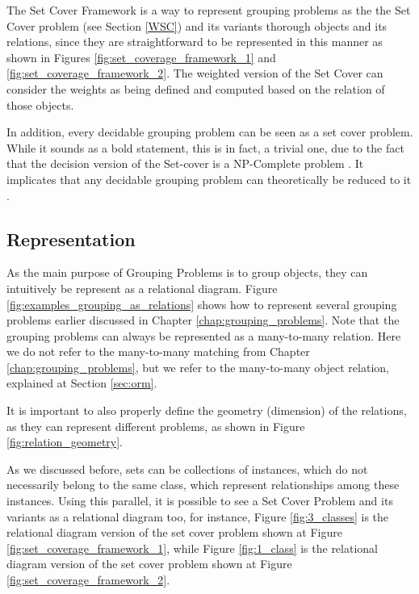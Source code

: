         The Set Cover Framework is a way to represent grouping problems as the the Set Cover problem (see Section \ref{WSC}) and its variants thorough objects and its relations, since they are straightforward to be represented in this manner as shown in Figures \ref{fig:set_coverage_framework_1} and \ref{fig:set_coverage_framework_2}.
        The weighted version of the Set Cover can consider the weights as being defined and computed based on the relation of those objects.

        In addition, every decidable grouping problem can be seen as a set cover problem.
        While it sounds as a bold statement, this is in fact, a trivial one, due to the fact that the decision version of the Set-cover is a NP-Complete problem \cite{karp1972reducibility}.
        It implicates that any decidable grouping problem can theoretically be reduced to it \cite{garey1979computers}.

        
        
    
        \subsection{Representation}
             As the main purpose of Grouping Problems is to group objects, they can intuitively be represent as a relational diagram. Figure \ref{fig:examples_grouping_as_relations} shows how to represent several grouping problems earlier discussed in Chapter \ref{chap:grouping_problems}.
             Note that the grouping problems can always be represented as a many-to-many relation. Here we do not refer to the many-to-many matching from Chapter \ref{chap:grouping_problems}, but we refer to the many-to-many object relation, explained at Section \ref{sec:orm}.

                  
             
            It is important to also properly define the geometry (dimension) of the relations, as they can represent different problems, as shown in Figure \ref{fig:relation_geometry}.

                         

            
            As we discussed before, sets can be collections of instances, which do not necessarily belong to the same class, which represent relationships among these instances. Using this parallel, it is possible to see a Set Cover Problem and its variants as a relational diagram too, for instance, Figure \ref{fig:3_classes} is the relational diagram version of the set cover problem shown at Figure \ref{fig:set_coverage_framework_1}, while Figure \ref{fig:1_class} is the relational diagram version of the set cover problem shown at Figure \ref{fig:set_coverage_framework_2}.

